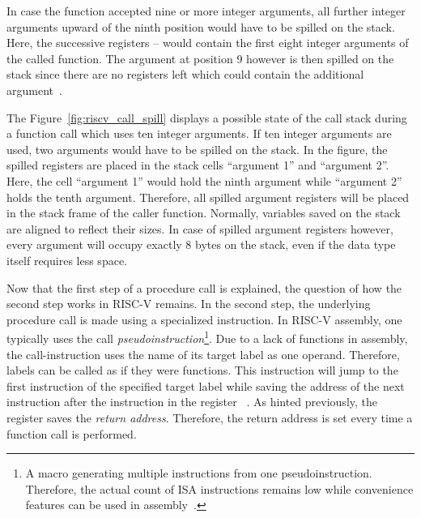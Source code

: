 In case the function accepted nine or more integer arguments,
all further integer arguments upward of the ninth position would have to be spilled on the stack.
Here, the successive registers -- would contain the first eight integer arguments of the called function.
The argument at position 9 however is then spilled on the stack since there are no registers left which could contain the additional argument~\cite[p~.8]{RiscvABI2022}.

The Figure~\ref{fig:riscv_call_spill} displays a possible state of the call stack during a function call which uses ten integer arguments.
If ten integer arguments are used, two arguments would have to be spilled on the stack.
In the figure, the spilled registers are placed in the stack cells \enquote{argument 1} and \enquote{argument 2}.
Here, the cell \enquote{argument 1} would hold the ninth argument while \enquote{argument 2} holds the tenth argument.
Therefore, all spilled argument registers will be placed in the stack frame of the caller function.
Normally, variables saved on the stack are aligned to reflect their sizes.
In case of spilled argument registers however, every argument will occupy exactly 8 bytes on the stack, even if the data type itself requires less space.

Now that the first step of a procedure call is explained, the question of how the second step works in RISC-V remains.
In the second step, the underlying procedure call is made using a specialized instruction.
In RISC-V assembly, one typically uses the call \emph{pseudoinstruction}\footnote{A macro generating multiple instructions from one pseudoinstruction. Therefore, the actual count of ISA instructions remains low while convenience features can be used in assembly~\cite[p.~68]{Dandamudi2005}.}.
Due to a lack of functions in assembly, the call-instruction uses the name of its target label as one operand.
Therefore, labels can be called as if they were functions.
This instruction will jump to the first instruction of the specified target label while saving the address of the next instruction after the  instruction in the register ~\cite[p.~22]{Patterson2017}.
As hinted previously, the  register saves the \emph{return address}.
Therefore, the return address is set every time a function call is performed.

